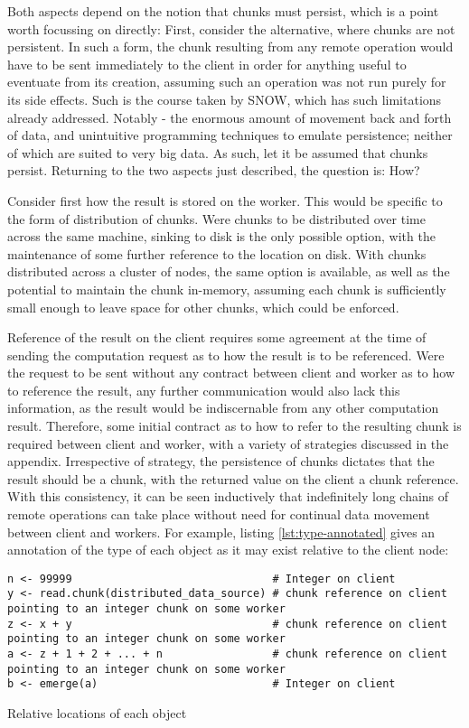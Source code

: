 Both aspects depend on the notion that chunks must persist, which is a
point worth focussing on directly: First, consider the alternative,
where chunks are not persistent. In such a form, the chunk resulting
from any remote operation would have to be sent immediately to the
client in order for anything useful to eventuate from its creation,
assuming such an operation was not run purely for its side effects. Such
is the course taken by SNOW, which has such limitations already
addressed. Notably - the enormous amount of movement back and forth of
data, and unintuitive programming techniques to emulate persistence;
neither of which are suited to very big data. As such, let it be assumed
that chunks persist. Returning to the two aspects just described, the
question is: How?

Consider first how the result is stored on the worker. This would be
specific to the form of distribution of chunks. Were chunks to be
distributed over time across the same machine, sinking to disk is the
only possible option, with the maintenance of some further reference to
the location on disk. With chunks distributed across a cluster of nodes,
the same option is available, as well as the potential to maintain the
chunk in-memory, assuming each chunk is sufficiently small enough to
leave space for other chunks, which could be enforced.

Reference of the result on the client requires some agreement at the
time of sending the computation request as to how the result is to be
referenced. Were the request to be sent without any contract between
client and worker as to how to reference the result, any further
communication would also lack this information, as the result would be
indiscernable from any other computation result. Therefore, some initial
contract as to how to refer to the resulting chunk is required between
client and worker, with a variety of strategies discussed in the
appendix. Irrespective of strategy, the persistence of chunks dictates
that the result should be a chunk, with the returned value on the client
a chunk reference. With this consistency, it can be seen inductively
that indefinitely long chains of remote operations can take place
without need for continual data movement between client and workers. For
example, listing \cref{lst:type-annotated} gives an annotation of the type of each
object as it may exist relative to the client node:

\begin{listing}
    \begin{verbatim}
n <- 99999                               # Integer on client
y <- read.chunk(distributed_data_source) # chunk reference on client pointing to an integer chunk on some worker
z <- x + y                               # chunk reference on client pointing to an integer chunk on some worker
a <- z + 1 + 2 + ... + n                 # chunk reference on client pointing to an integer chunk on some worker
b <- emerge(a)                           # Integer on client
    \end{verbatim}
    \caption{Relative locations of each object}
    \label{lst:type-annotated}
\end{listing}

